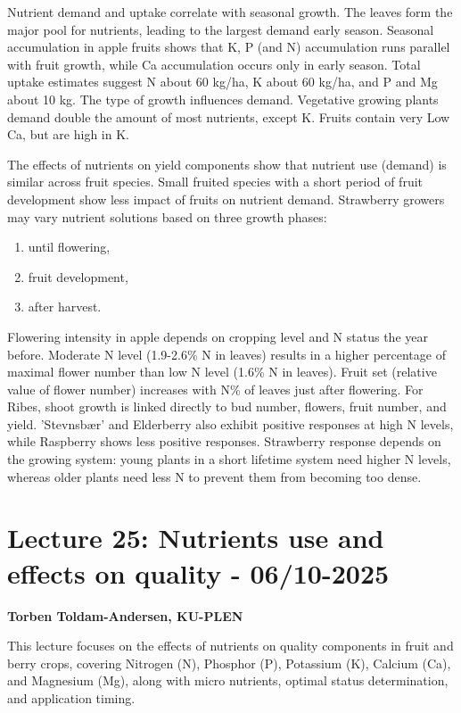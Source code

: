 \vspace{0.5em}
Nutrient demand and uptake correlate with seasonal growth. The leaves form the major pool for nutrients, leading to the largest demand early season. Seasonal accumulation in apple fruits shows that K, P (and N) accumulation runs parallel with fruit growth, while Ca accumulation occurs only in early season. Total uptake estimates suggest N about 60 kg/ha, K about 60 kg/ha, and P and Mg about 10 kg. The type of growth influences demand. Vegetative growing plants demand double the amount of most nutrients, except K. Fruits contain very Low Ca, but are high in K.

\vspace{0.5em}
The effects of nutrients on yield components show that nutrient use (demand) is similar across fruit species. Small fruited species with a short period of fruit development show less impact of fruits on nutrient demand. Strawberry growers may vary nutrient solutions based on three growth phases: 

\begin{enumerate} 
    \item until flowering, 
    \item fruit development, 
    \item after harvest. 
\end{enumerate} 

\vspace{0.5em}
Flowering intensity in apple depends on cropping level and N status the year before. Moderate N level (1.9-2.6\% N in leaves) results in a higher percentage of maximal flower number than low N level (1.6\% N in leaves). Fruit set (relative value of flower number) increases with N\% of leaves just after flowering. For Ribes, shoot growth is linked directly to bud number, flowers, fruit number, and yield. 'Stevnsbær' and Elderberry also exhibit positive responses at high N levels, while Raspberry shows less positive responses. Strawberry response depends on the growing system: young plants in a short lifetime system need higher N levels, whereas older plants need less N to prevent them from becoming too dense.


\section{Lecture 25: Nutrients use and effects on quality - 06/10-2025}
\textbf{Torben Toldam-Andersen, KU-PLEN}

\vspace{1em}
This lecture focuses on the effects of nutrients on quality components in fruit and berry crops, covering Nitrogen (N), Phosphor (P), Potassium (K), Calcium (Ca), and Magnesium (Mg), along with micro nutrients, optimal status determination, and application timing.

